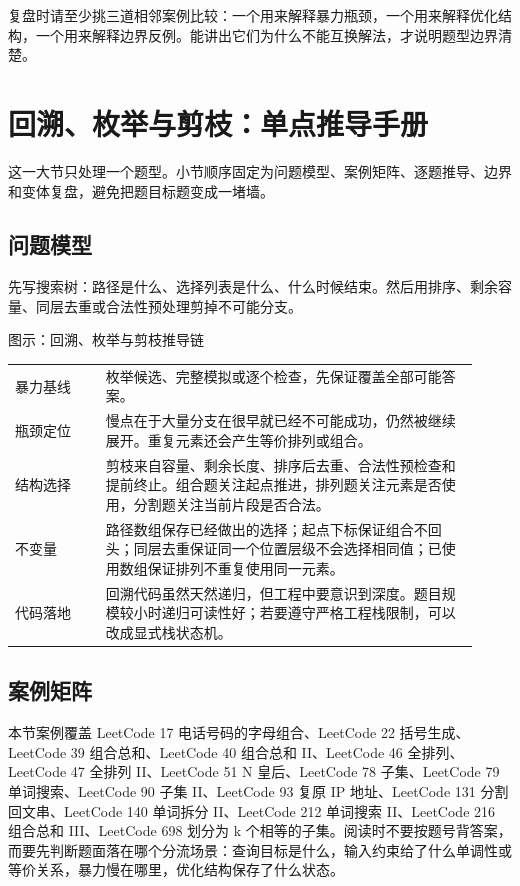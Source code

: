 复盘时请至少挑三道相邻案例比较：一个用来解释暴力瓶颈，一个用来解释优化结构，一个用来解释边界反例。能讲出它们为什么不能互换解法，才说明题型边界清楚。

\section{回溯、枚举与剪枝：单点推导手册}
这一大节只处理一个题型。小节顺序固定为问题模型、案例矩阵、逐题推导、边界和变体复盘，避免把题目标题变成一堵墙。

\subsection{问题模型}

先写搜索树：路径是什么、选择列表是什么、什么时候结束。然后用排序、剩余容量、同层去重或合法性预处理剪掉不可能分支。

\begin{principlebox}{图示：回溯、枚举与剪枝推导链}
\begin{tabular}{@{}p{0.18\linewidth}p{0.74\linewidth}@{}}
暴力基线 & 枚举候选、完整模拟或逐个检查，先保证覆盖全部可能答案。\\
瓶颈定位 & 慢点在于大量分支在很早就已经不可能成功，仍然被继续展开。重复元素还会产生等价排列或组合。\\
结构选择 & 剪枝来自容量、剩余长度、排序后去重、合法性预检查和提前终止。组合题关注起点推进，排列题关注元素是否使用，分割题关注当前片段是否合法。\\
不变量 & 路径数组保存已经做出的选择；起点下标保证组合不回头；同层去重保证同一个位置层级不会选择相同值；已使用数组保证排列不重复使用同一元素。\\
代码落地 & 回溯代码虽然天然递归，但工程中要意识到深度。题目规模较小时递归可读性好；若要遵守严格工程栈限制，可以改成显式栈状态机。\\
\end{tabular}
\end{principlebox}

\subsection{案例矩阵}

本节案例覆盖 LeetCode 17 电话号码的字母组合、LeetCode 22 括号生成、LeetCode 39 组合总和、LeetCode 40 组合总和 II、LeetCode 46 全排列、LeetCode 47 全排列 II、LeetCode 51 N 皇后、LeetCode 78 子集、LeetCode 79 单词搜索、LeetCode 90 子集 II、LeetCode 93 复原 IP 地址、LeetCode 131 分割回文串、LeetCode 140 单词拆分 II、LeetCode 212 单词搜索 II、LeetCode 216 组合总和 III、LeetCode 698 划分为 k 个相等的子集。阅读时不要按题号背答案，而要先判断题面落在哪个分流场景：查询目标是什么，输入约束给了什么单调性或等价关系，暴力慢在哪里，优化结构保存了什么状态。

